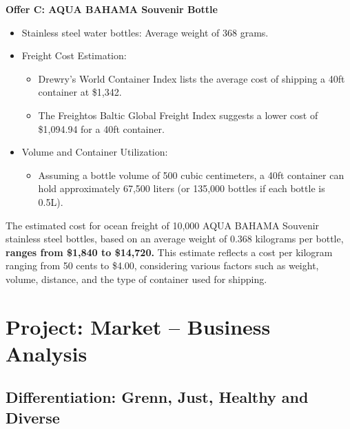 \documentclass{article}
\begin{document}
\textbf{Offer C: AQUA BAHAMA Souvenir Bottle}\par
\begin{itemize}
    \item Stainless steel water bottles: Average weight of 368 grams.
    \item Freight Cost Estimation:
    \begin{itemize}
        \item Drewry’s World Container Index lists the average cost of shipping a 40ft container at \$1,342.
        \item The Freightos Baltic Global Freight Index suggests a lower cost of \$1,094.94 for a 40ft container.
    \end{itemize}
    \item Volume and Container Utilization:
    \begin{itemize}
        \item Assuming a bottle volume of 500 cubic centimeters, a 40ft container can hold approximately 67,500 liters (or 135,000 bottles if each bottle is 0.5L).
    \end{itemize}
\end{itemize}

The estimated cost for ocean freight of 10,000 AQUA BAHAMA Souvenir stainless steel bottles, based on an average weight of 0.368 kilograms per bottle, \textbf{ranges from \$1,840 to \$14,720.} This estimate reflects a cost per kilogram ranging from 50 cents to \$4.00, considering various factors such as weight, volume, distance, and the type of container used for shipping.

\section{Project: Market – Business Analysis}
\subsection{Differentiation: Grenn, Just, Healthy and Diverse}
\end{document}
